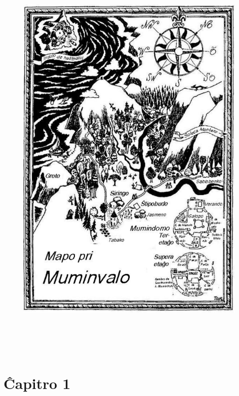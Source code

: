 \thispagestyle{empty}
\setcounter{page}{3}
\vspace*{.5em}

\begin{figure}[htbp]
\centering
\includegraphics[width=394pt,height=580pt]{map-bildo.png}
\caption{}
\label{map-bildo}
\end{figure}

\chapter*[Ĉapitro 1]{Ĉapitro 1}


